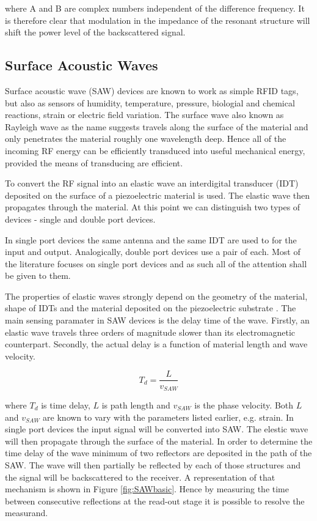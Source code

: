 \documentclass[11pt,a4paper]{article}
\begin{document}
where A and B are complex numbers independent of the difference frequency. It is therefore clear that modulation in the impedance of the resonant structure will shift the power level of the backscattered signal.

\subsection{Surface Acoustic Waves}

Surface acoustic wave (SAW) devices are known to work as simple RFID tags, but also as sensors of humidity, temperature, pressure, biologial and chemical reactions, strain or electric field variation. The surface wave also known as Rayleigh wave \cite{rayleigh} as the name suggests travels along the surface of the material and only penetrates the material roughly one wavelength deep. Hence all of the incoming RF energy can be efficiently transduced into useful mechanical energy, provided the means of transducing are efficient. 

To convert the RF signal into an elastic wave an interdigital transducer (IDT) deposited on the surface of a piezoelectric material is used. The elastic wave then propagates through the material. At this point we can distinguish two types of devices - single and double port devices.

In single port devices the same antenna and the same IDT are used to for the input and output. Analogically, double port devices use a pair of each. Most of the literature focuses on single port devices and as such all of the attention shall be given to them.

The properties of elastic waves strongly depend on the geometry of the material, shape of IDTs and the material deposited on the piezoelectric substrate \cite{SAWapps}. The main sensing paramater in SAW devices is the delay time of the wave. Firstly, an elastic wave travels three orders of magnitude slower than its electromagnetic counterpart. Secondly, the actual delay is a function of material length and wave velocity. 

\begin{equation}
T_d = \frac{L}{v_{SAW}}
\end{equation}

where $T_d$ is time delay, $L$ is path length and $v_{SAW}$ is the phase velocity. Both $L$ and $v_{SAW}$ are known to vary with the parameters listed earlier, e.g. strain. In single port devices the input signal will be converted into SAW. The elestic wave will then propagate through the surface of the material. In order to determine the time delay of the wave minimum of two reflectors are deposited in the path of the SAW. The wave will then partially be reflected by each of those structures and the signal will be backscattered to the receiver. A representation of that mechanism is shown in Figure \ref{fig:SAWbasic}. Hence by measuring the time between consecutive reflections at the read-out stage it is possible to resolve the measurand.
\end{document}
